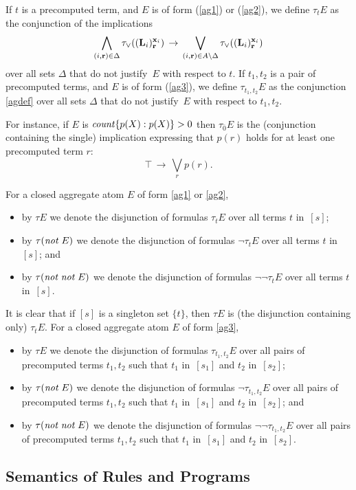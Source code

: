 \documentclass{tlp}
\def\o{\overline}
\def\rar{\rightarrow}
\def\beq{\begin{equation}}
\def\eeq#1{\label{#1}\end{equation}}
\def\no{{\it not}}
\begin{document}
If $t$ is a precomputed term, and $E$ is of form (\ref{ag1}) or (\ref{ag2}),
we define $\tau_t E$ as the conjunction of the implications
\beq
  \bigwedge_{(i, {\bf r})\in\Delta}\tau_{\lor}(({\bf L}_i)^{{\bf x}_i}_{\bf r})
  \,\rar\,
  \bigvee_{(i,{\bf r})\in A\setminus\Delta}\tau_{\lor}(({\bf L}_i)^{{\bf x}_i}_
  {\bf r})
\eeq{agdef}
over all sets $\Delta$ that do not justify~$E$ with respect to $t$.
If $t_1,t_2$ is a pair of precomputed terms, and $E$ is of form (\ref{ag3}),
we define $\tau_{t_1,t_2} E$ as the conjunction \eqref{agdef}
over all sets $\Delta$ that do not justify~$E$ with respect to $t_1,t_2$.

For instance, if $E$ is
${\it count}\{p(X):p(X)\} > 0$
then $\tau_{\o 0} E$ is the
(conjunction containing the single) implication expressing that $p(r)$ holds for at least one precomputed term $r$:
$$
\top \,\rar\, \bigvee_r p(r).
$$

For a closed aggregate atom $E$ of form \eqref{ag1} or \eqref{ag2},
\begin{itemize}
\item by $\tau E$ we denote the disjunction of formulas $\tau_t E$
over all terms $t$ in~$[s]$;
\item by $\tau (\no \; E)$ we denote the disjunction of formulas $\neg \tau_t E$
over all terms $t$ in~$[s]$; and
\item by $\tau (\no \; \no \; E)$ we denote the disjunction of formulas
$\neg \neg \tau_t E$ over all terms $t$ in~$[s]$.
\end{itemize}
It is clear that if $[s]$ is a singleton set $\{t\}$, then $\tau E$ is (the
disjunction containing only) $\tau_t E$.
For a closed aggregate atom $E$ of form \eqref{ag3},
\begin{itemize}
\item by $\tau E$ we denote the disjunction of formulas $\tau_{t_1,t_2} E$
over all pairs of precomputed terms $t_1, t_2$ such that $t_1$ in~$[s_1]$ and
$t_2$ in~$[s_2]$;
\item by $\tau(\no \; E)$ we denote the disjunction of formulas
$\neg \tau_{t_1,t_2} E$ over all pairs of precomputed terms $t_1, t_2$ such
that $t_1$ in~$[s_1]$ and $t_2$ in~$[s_2]$; and
\item by $\tau(\no \; \no \; E)$ we denote the disjunction of formulas
$\neg \neg \tau_{t_1,t_2} E$ over all pairs of precomputed terms $t_1, t_2$ such
that $t_1$ in~$[s_1]$ and $t_2$ in~$[s_2]$.
\end{itemize}

\subsection{Semantics of Rules and Programs} \label{ssec:grules}
\end{document}
